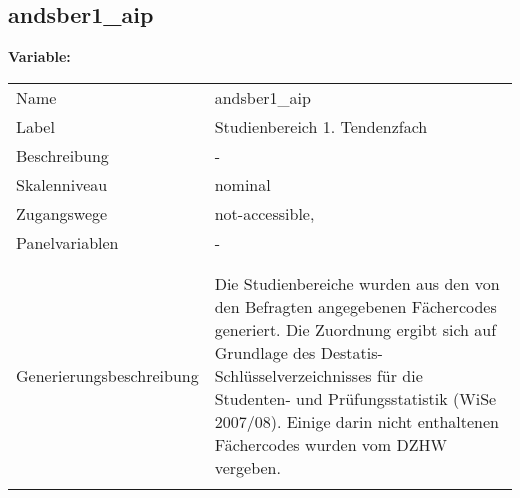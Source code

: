 	
	
	\subsection{andsber1\_aip}
	\label{subSection:andsber1_aip}

	\noindent\textbf{Variable:}\\
		\begin{tabular}{lL{11.3cm}}
			\label{tableVariable:andsber1_aip}
			Name & andsber1\_aip \\
			Label & Studienbereich 1. Tendenzfach \\
			Beschreibung & - \\
			Skalenniveau & nominal \\
			Zugangswege &
				not-accessible,
 \\
			Panelvariablen & -
			 \\
			 \\
 \\
					Generierungsbeschreibung & Die Studienbereiche wurden aus den von den Befragten angegebenen Fächercodes generiert. Die Zuordnung ergibt sich auf Grundlage des Destatis-Schlüsselverzeichnisses für die Studenten- und Prüfungsstatistik (WiSe 2007/08). Einige darin nicht enthaltenen Fächercodes wurden vom DZHW vergeben. 
				 \\	
			 \\
		\end{tabular}






	
	\newpage
